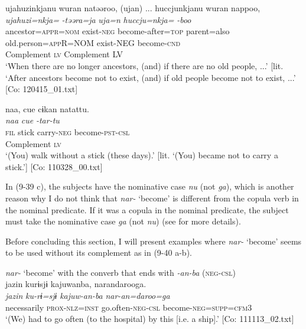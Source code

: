 \ex \label{ex:9.39c} %
    \gllll  ujahuzinkjanu  wuran  natəəroo,  (ujan)  ...  huccjunkjanu  wuran  nappoo,\\
      \textit{ujahuzi=nkja=}  \textit{}  \textit{-təəra=ja}  \textit{uja=n} {} \textit{huccju=nkja=}  \textit{}  \textit{-boo}\\
      ancestor=\textsc{appr}=\textsc{nom}  exist-\textsc{neg}  become-after=\textsc{top}  parent=also  {} old.person=\textsc{app}R=NOM  exist-NEG  become-\textsc{cnd}\\
      {}  Complement  \textsc{lv}           {}                      {}     {}        Complement  LV\\
      \glt       ‘When there are no longer ancestors, (and) if there are no old people, ...’ [lit. ‘After ancestors become not to exist, (and) if old people become not to exist, ...’ [Co: 120415\_01.txt]

\ex \label{ex:9.39d} %
    \gllll  naa,  {\textbar}cue{\textbar}  cɨkan  natattu.\\
      \textit{naa}  \textit{cue}  \textit{}  \textit{-tar-tu}\\
      \textsc{fil}  stick  carry-\textsc{neg}  become-\textsc{pst}-\textsc{csl}\\
       {} {}   Complement  \textsc{lv}\\
      \glt       ‘(You) walk without a stick (these days).’ [lit. ‘(You) became not to carry a stick.’] [Co: 110328\_00.txt]
    \z
\z

In (9-39 c), the subjects have the nominative case \textit{nu} (not \textit{ga}), which is another reason why I do not think that \textit{nar-} ‘become’ is different from the copula verb in the nominal predicate. If it was a copula in the nominal predicate, the subject must take the nominative case \textit{ga} (not \textit{nu}) (see  for more details).

Before concluding this section, I will present examples where \textit{nar-} ‘become’ seems to be used without its complement as in (9-40 a-b).

\ea \label{ex:9.40}

\ea \textit{nar-} ‘become’ with the converb that ends with \textit{{}-an-ba} (\textsc{neg}-\textsc{csl})\\
 \glll  jazin  kurɨsjɨ  kajuwanba,  narandarooga.\\
    \textit{jazin}  \textit{ku-rɨ=sjɨ}  \textit{kajuw-an-ba}  \textit{nar-an=daroo=ga}\\
    necessarily  \textsc{prox}-\textsc{nlz}=\textsc{inst}  go.often-\textsc{neg}-\textsc{csl}  become-\textsc{neg}=\textsc{supp}=\textsc{cfm}3\\
    \glt     ‘(We) had to go often (to the hospital) by this [i.e. a ship].’ [Co: 111113\_02.txt]

